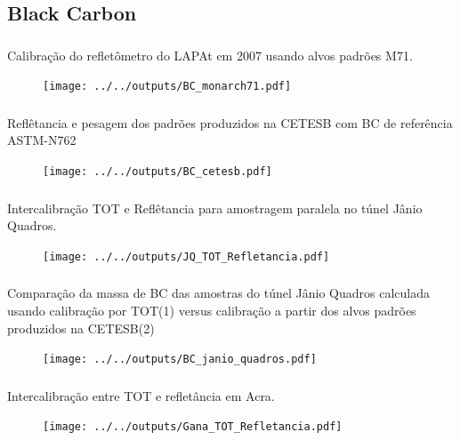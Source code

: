 \subsection{Black Carbon}
\begin{frame}
  \frametitle{}
  Calibração do refletômetro do LAPAt em 2007 usando alvos padrões M71.
  \begin{figure}[H]
    \centering
    \texttt{[image: ../../outputs/BC\_monarch71.pdf]}
  \end{figure}
\end{frame}


\begin{frame}
  \frametitle{}
  Reflêtancia e pesagem dos padrões produzidos na CETESB com BC 
  de referência ASTM-N762
  \begin{figure}[H]
  	\centering
  	\texttt{[image: ../../outputs/BC\_cetesb.pdf]}
  \end{figure}
\end{frame}


\begin{frame}
  \frametitle{}
  Intercalibração TOT e Reflêtancia para amostragem paralela no 
  túnel Jânio Quadros.
  \begin{figure}[H]
    \centering
    \texttt{[image: ../../outputs/JQ\_TOT\_Refletancia.pdf]}
  \end{figure}
\end{frame}


\begin{frame}
  \frametitle{}
  Comparação da massa de BC das amostras do túnel Jânio Quadros 
                 calculada usando calibração por TOT(1) versus calibração a partir dos 
                 alvos padrões produzidos na CETESB(2)
  \begin{figure}[H]
    \centering
      \texttt{[image: ../../outputs/BC\_janio\_quadros.pdf]}

  \end{figure}
\end{frame}


\begin{frame}
  \frametitle{}
  Intercalibração entre TOT e refletância em Acra.
  \begin{figure}[H]
  	\begin{center}
  		\texttt{[image: ../../outputs/Gana\_TOT\_Refletancia.pdf]}

  	\end{center}
  \end{figure}
\end{frame}

